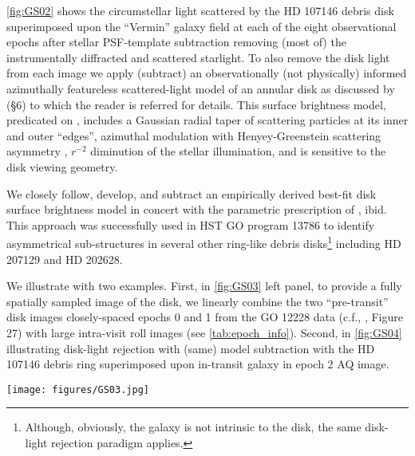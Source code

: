 \documentclass{aa}
\begin{document}
\autoref{fig:GS02} shows the circumstellar light scattered by the HD 107146 debris disk superimposed upon  the “Vermin” galaxy field at each of the eight observational epochs after stellar PSF-template subtraction removing (most of) the instrumentally diffracted and scattered starlight. To also remove the disk light from each image we apply (subtract) an observationally (not physically) informed azimuthally featureless scattered-light model of an annular disk as discussed by \cite{schneider2016extinction} (§6) to which the reader is referred for details. This surface brightness model, predicated on \cite{schneider2006discovery}, includes a Gaussian radial taper of scattering particles at its inner and outer “edges”, azimuthal modulation with Henyey-Greenstein scattering asymmetry \citep{henyey1941diffuse}, $r^{-2}$ diminution of the stellar illumination, and is sensitive to the disk viewing geometry.

We closely follow, develop, and subtract an empirically derived best-fit disk surface brightness model in concert with the parametric prescription of \cite{schneider2016extinction}, ibid. This approach was successfully used in HST GO program 13786 to identify asymmetrical sub-structures in several other ring-like debris disks\footnote{Although, obviously, the galaxy is not intrinsic to the disk, the same disk-light rejection paradigm applies.} including HD 207129 and HD 202628. 

We illustrate with two examples. First, in \autoref{fig:GS03} left panel, to provide a fully spatially sampled image of the disk, we linearly combine the two “pre-transit” disk images closely-spaced epochs 0 and 1 from the GO 12228 data (c.f., \cite{schneider2014probing}, Figure 27) with large intra-visit roll images (see \autoref{tab:epoch_info}). Second, in \autoref{fig:GS04} illustrating disk-light rejection with (same) model subtraction with the HD 107146 debris ring superimposed upon in-transit galaxy in epoch 2 AQ image.

\begin{figure*}[ht]
    \centering
    \texttt{[image: figures/GS03.jpg]}
    \caption{Left: Epoch 0+1 AQ image of the HD 107146 debris ring fully sampled with the Vermin galaxy well separated beyond the periphery of the disk. Linear display range $\pm 0.05$ counts per second per pixel to show the structure of remaining PSF-subtraction residuals without saturating at the radius of highest surface brightness while also revealing the low level of “pixel to pixel” noise in the sky background at the field boundaries.  Middle: Model disk image at same display stretch derived from all eight epochs with galaxy masked. Right: Representative surface brightness radial profile/cross-section (arbitrarily along disk major axis) comparison of AQ image (solid line) vs. model comparison (dot-dashed line) showing excellent agreement at $r > 65$ pixels ($3.3”$) in region of interest of galaxy reflex motion at epochs 0 – 7 inclusive.}
    \label{fig:GS03}
\end{figure*}
\end{document}
